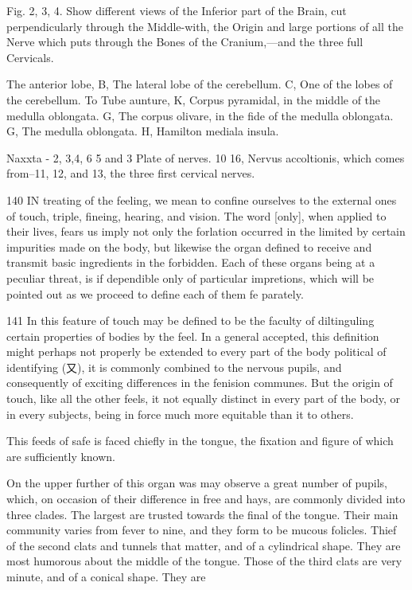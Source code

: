\documentclass{article}
\begin{document}
Fig. 2, 3, 4. Show different views of the Inferior part of the Brain, cut perpendicularly through the Middle-with, the Origin and large portions of all the Nerve which puts through the Bones of the Cranium,—and the three full Cervicals.

The anterior lobe, B, The lateral lobe of the cerebellum. C, One of the lobes of the cerebellum. To Tube aunture, K, Corpus pyramidal, in the middle of the medulla oblongata. G, The corpus olivare, in the fide of the medulla oblongata. G, The medulla oblongata. H, Hamilton mediala insula.

Naxxta - 2, 3,4, 6 5 and 3 Plate of nerves. 10 16, Nervus accoltionis, which comes from--11, 12, and 13, the three first cervical nerves.

140 IN treating of the feeling, we mean to confine ourselves to the external ones of touch, triple, fineing, hearing, and vision. The word [only], when applied to their lives, fears us imply not only the forlation occurred in the limited by certain impurities made on the body, but likewise the organ defined to receive and transmit basic ingredients in the forbidden. Each of these organs being at a peculiar threat, is if dependible only of particular impretions, which will be pointed out as we proceed to define each of them fe parately.

141 In this feature of touch may be defined to be the faculty of diltinguling certain properties of bodies by the feel. In a general accepted, this definition might perhaps not properly be extended to every part of the body political of identifying (又), it is commonly combined to the nervous pupils, and consequently of exciting differences in the fenision communes. But the origin of touch, like all the other feels, it not equally distinct in every part of the body, or in every subjects, being in force much more equitable than it to others.

This feeds of safe is faced chiefly in the tongue, the fixation and figure of which are sufficiently known.

On the upper further of this organ was may observe a great number of pupils, which, on occasion of their difference in free and hays, are commonly divided into three clades. The largest are trusted towards the final of the tongue. Their main community varies from fever to nine, and they form to be mucous folicles. Thief of the second clats and tunnels that matter, and of a cylindrical shape. They are most humorous about the middle of the tongue. Those of the third clats are very minute, and of a conical shape. They are
\end{document}
